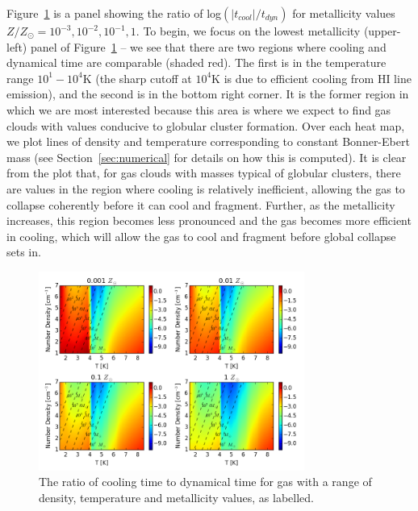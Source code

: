 \documentclass[useAMS,usenatbib]{mn2e}
\begin{document}
Figure~\ref{fig:cooling_to_freefall} is a panel showing the ratio of log$(|t_{cool}|/t_{dyn})$ for metallicity values $Z/Z_{\odot}=10^{-3},10^{-2},10^{-1},1$.  To begin, we focus on the lowest metallicity  (upper-left) panel of Figure~\ref{fig:cooling_to_freefall} -- we see that there are two regions where cooling and dynamical time are comparable (shaded red). The first is in the temperature range $10^1-10^4$K (the sharp cutoff at $10^4$K is due to efficient cooling from HI line emission), and the second is in the bottom right corner. It is the former region in which we are most interested because this area is where we expect to find gas clouds with values conducive to globular cluster formation. Over each heat map, we plot lines of density and temperature corresponding to constant Bonner-Ebert mass (see Section~\ref{sec:numerical} for details on how this is computed). It is clear from the plot that, for gas clouds with masses typical of globular clusters, there are values in the region where cooling is relatively inefficient, allowing the gas to collapse coherently before it can cool and fragment. Further, as the metallicity increases, this region becomes less pronounced and the gas becomes more efficient in cooling, which will allow the gas to cool and fragment before global collapse sets in.

\begin{figure}
\begin{center}
\mbox{\includegraphics[width=8.7cm]{Images/cooling_to_freefall_no_background}}
\end{center}
\caption{\label{fig:cooling_to_freefall} The ratio of cooling time to dynamical time for gas with a range of density, temperature and metallicity values, as labelled.}
\end{figure}
\end{document}
